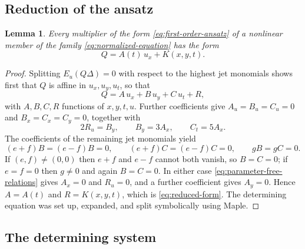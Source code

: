 \documentclass[11pt]{article}
\numberwithin{equation}{section}
\newtheorem{lemma}[theorem]{Lemma}
\theoremstyle{definition}
\theoremstyle{remark}
\begin{document}
\subsection{Reduction of the ansatz}

\begin{lemma}
\label{lem:first-order-reduction}
Every multiplier of the form \eqref{eq:first-order-ansatz} of a
nonlinear member of the family \eqref{eq:normalized-equation} has the
form
\begin{equation}
Q = A(t)\,u_x + K(x,y,t).
\label{eq:reduced-form}
\end{equation}
\end{lemma}

\begin{proof}
Splitting $E_u(Q\Delta)=0$ with respect to the highest jet monomials
shows first that $Q$ is affine in $u_x,u_y,u_t$, so that
\begin{equation}
Q = A\,u_x + B\,u_y + C\,u_t + R,
\label{eq:affine-form}
\end{equation}
with $A,B,C,R$ functions of $x,y,t,u$. Further coefficients give
$A_u=B_u=C_u=0$ and $B_x=C_x=C_y=0$, together with
\begin{equation}
2R_u = B_y,
\qquad
B_y = 3A_x,
\qquad
C_t = 5A_x .
\label{eq:parameter-free-relations}
\end{equation}
The coefficients of the remaining jet monomials yield
\begin{equation}
(e+f)B = (e-f)B = 0,
\qquad
(e+f)C = (e-f)C = 0,
\qquad
gB = gC = 0 .
\label{eq:BC-conditions}
\end{equation}
If $(e,f)\neq(0,0)$ then $e+f$ and $e-f$ cannot both vanish, so
$B=C=0$; if $e=f=0$ then $g\neq0$ and again $B=C=0$. In either case
\eqref{eq:parameter-free-relations} gives $A_x=0$ and $R_u=0$, and a
further coefficient gives $A_y=0$. Hence $A=A(t)$ and $R=K(x,y,t)$,
which is \eqref{eq:reduced-form}. The determining equation was set up, expanded, and split
symbolically using Maple.
\end{proof}

\subsection{The determining system}
\end{document}

